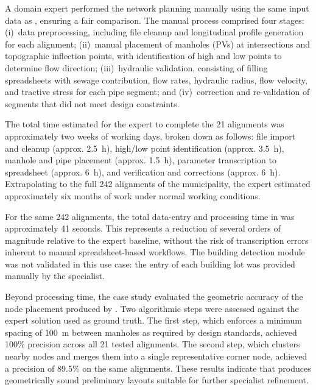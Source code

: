 A domain expert performed the network planning manually using the same input data as \method, ensuring a fair comparison.
The manual process comprised four stages: (i)~data preprocessing, including file cleanup and longitudinal profile generation for each alignment;
(ii)~manual placement of manholes (PVs) at intersections and topographic inflection points, with identification of high and low points to determine flow direction;
(iii)~hydraulic validation, consisting of filling spreadsheets with sewage contribution, flow rates, hydraulic radius, flow velocity, and tractive stress for each pipe segment;
and (iv)~correction and re-validation of segments that did not meet design constraints.

The total time estimated for the expert to complete the 21 alignments was approximately two weeks of working days, broken down as follows:
file import and cleanup (approx. 2.5~h), high/low point identification (approx. 3.5~h), manhole and pipe placement (approx. 1.5~h), parameter transcription to spreadsheet (approx. 6~h), and verification and corrections (approx. 6~h).
Extrapolating to the full 242 alignments of the municipality, the expert estimated approximately six months of work under normal working conditions.

For the same 242 alignments, the total data-entry and processing time in \method was approximately 41 seconds.
This represents a reduction of several orders of magnitude relative to the expert baseline, without the risk of transcription errors inherent to manual spreadsheet-based workflows.
The building detection module was not validated in this use case: the entry of each building lot was provided manually by the specialist.

Beyond processing time, the case study evaluated the geometric accuracy of the node placement produced by \method.
Two algorithmic steps were assessed against the expert solution used as ground truth.
The first step, which enforces a minimum spacing of 100~m between manholes as required by design standards, achieved 100\% precision across all 21 tested alignments.
The second step, which clusters nearby nodes and merges them into a single representative corner node, achieved a precision of 89.5\% on the same alignments.
These results indicate that \method produces geometrically sound preliminary layouts suitable for further specialist refinement.


